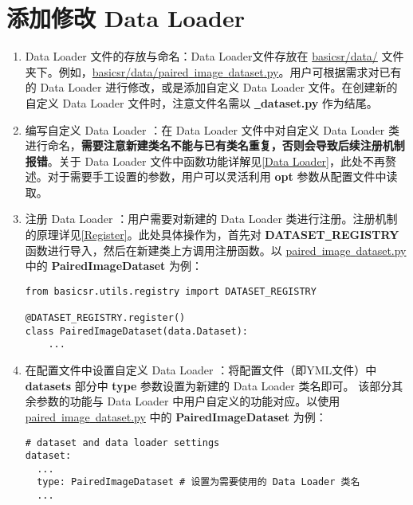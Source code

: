 \documentclass[../main.tex]{subfiles}
\begin{document}
\section{添加修改 Data Loader}
\begin{enumerate}
    \item Data Loader 文件的存放与命名：Data Loader文件存放在 \href{https://github.com/XPixelGroup/BasicSR/tree/master/basicsr/data}{basicsr/data/} 文件夹下。例如，\href{https://github.com/XPixelGroup/BasicSR/tree/master/basicsr/data}{basicsr/data/paired\underline{~}image\underline{~}dataset.py}。用户可根据需求对已有的 Data Loader 进行修改，或是添加自定义 Data Loader 文件。在创建新的自定义 Data Loader 文件时，注意文件名需以  \textbf{\underline{~}dataset.py} 作为结尾。

    \item 编写自定义 Data Loader ：在 Data Loader 文件中对自定义 Data Loader 类进行命名，\textbf{需要注意新建类名不能与已有类名重复，否则会导致后续注册机制报错}。关于 Data Loader 文件中函数功能详解见\ref{Data Loader}，此处不再赘述。对于需要手工设置的参数，用户可以灵活利用 \textbf{opt} 参数从配置文件中读取。

    \item 注册 Data Loader ：用户需要对新建的 Data Loader 类进行注册。注册机制的原理详见\ref{Register}。此处具体操作为，首先对 \textbf{DATASET\underline{~}REGISTRY} 函数进行导入，然后在新建类上方调用注册函数。以 \href{https://github.com/XPixelGroup/BasicSR/tree/master/basicsr/data/paired_image_dataset.py}{paired\underline{~}image\underline{~}dataset.py} 中的 \textbf{PairedImageDataset} 为例：
          \begin{verbatim}
from basicsr.utils.registry import DATASET_REGISTRY

@DATASET_REGISTRY.register()
class PairedImageDataset(data.Dataset):
    ...
\end{verbatim}

    \item 在配置文件中设置自定义 Data Loader ：将配置文件（即YML文件）中 \textbf{datasets} 部分中 \textbf{type} 参数设置为新建的 Data Loader 类名即可。
          该部分其余参数的功能与 Data Loader 中用户自定义的功能对应。以使用 \href{https://github.com/XPixelGroup/BasicSR/tree/master/basicsr/data/paired_image_dataset.py}{paired\underline{~}image\underline{~}dataset.py} 中的 \textbf{PairedImageDataset} 为例：
          \begin{verbatim}
# dataset and data loader settings
dataset:
  ...
  type: PairedImageDataset # 设置为需要使用的 Data Loader 类名
  ...
\end{verbatim}
\end{enumerate}
\end{document}
